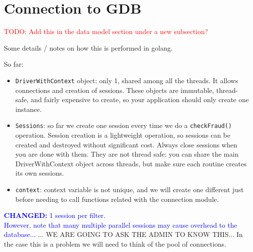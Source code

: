 \documentclass{article}
\begin{document}
\section{Connection to GDB}

\textcolor{red}{TODO: Add this in the data model section under a new subsection?}

Some details / notes on how this is performed in golang.


So far:
\begin{itemize}
  \item \texttt{DriverWithContext} object: only 1, shared among all the threads. It allows connections and creation of sessions. These objects are immutable, thread-safe, and fairly expensive to create, so your application should only create one instance.
  \item \texttt{Sessions}: so far we create one session every time we do a \texttt{checkFraud()} operation.
  Session creation is a lightweight operation, so sessions can be created and destroyed without significant cost. Always close sessions when you are done with them. They are not thread safe: you can share the main DriverWithContext object
  across threads, but make sure each routine creates its own sessions.
  \item \texttt{context}: context variable is not unique, and we will create one different just before needing to call functions related with the connection module.
\end{itemize}


\textcolor{blue}{\textbf{CHANGED:} 1 session per filter.\\
However, note that many multiple parallel sessions may cause overhead to the database...}
... WE ARE GOING TO ASK THE ADMIN TO KNOW THIS... In the case this is a problem we will need
to think of the pool of connections.



\end{document}
